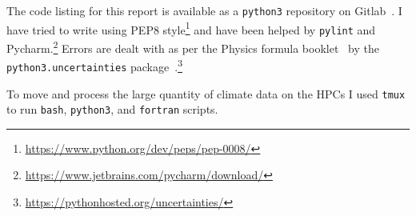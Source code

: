The code listing for this report is available as a \texttt{python3} repository on Gitlab~\cite{gitlab, skextremes}.
 I have tried to write using PEP8 style\footnote{\url{https://www.python.org/dev/peps/pep-0008/}}
 and have been helped by \texttt{pylint} and Pycharm.\footnote{\url{https://www.jetbrains.com/pycharm/download/}}
 Errors are dealt with as per the Physics formula booklet~\cite{MathsFormulaBooklet}
 by the \texttt{python3.uncertainties}
 package~\cite{lebigot2010uncertainties}.\footnote{\url{https://pythonhosted.org/uncertainties/}}

 To move and process the large quantity of climate data on the HPCs I used \texttt{tmux}
 to run \texttt{bash}, \texttt{python3}, and \texttt{fortran} scripts.
